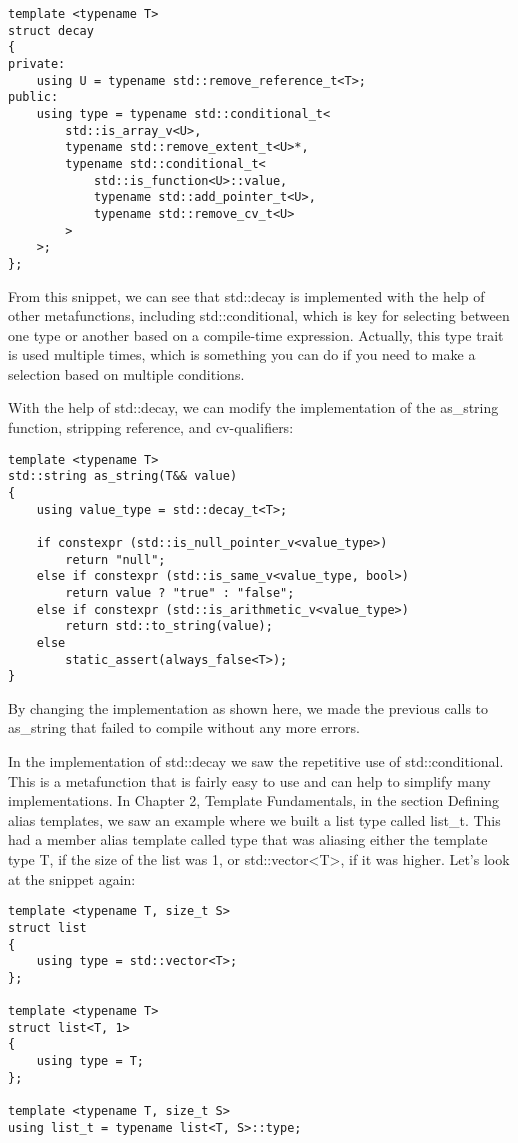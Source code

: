 \begin{lstlisting}[style=styleCXX]
template <typename T>
struct decay
{
private:
	using U = typename std::remove_reference_t<T>;
public:
	using type = typename std::conditional_t<
		std::is_array_v<U>,
		typename std::remove_extent_t<U>*,
		typename std::conditional_t<
			std::is_function<U>::value,
			typename std::add_pointer_t<U>,
			typename std::remove_cv_t<U>
		>
	>;
};
\end{lstlisting}

From this snippet, we can see that std::decay is implemented with the help of other metafunctions, including std::conditional, which is key for selecting between one type or another based on a compile-time expression. Actually, this type trait is used multiple times, which is something you can do if you need to make a selection based on multiple conditions.

With the help of std::decay, we can modify the implementation of the as\_string function, stripping reference, and cv-qualifiers:

\begin{lstlisting}[style=styleCXX]
template <typename T>
std::string as_string(T&& value)
{
	using value_type = std::decay_t<T>;
	
	if constexpr (std::is_null_pointer_v<value_type>)
		return "null";
	else if constexpr (std::is_same_v<value_type, bool>)
		return value ? "true" : "false";
	else if constexpr (std::is_arithmetic_v<value_type>)
		return std::to_string(value);
	else
		static_assert(always_false<T>);
}
\end{lstlisting}

By changing the implementation as shown here, we made the previous calls to as\_string that failed to compile without any more errors.

In the implementation of std::decay we saw the repetitive use of std::conditional. This is a metafunction that is fairly easy to use and can help to simplify many implementations. In Chapter 2, Template Fundamentals, in the section Defining alias templates, we saw an example where we built a list type called list\_t. This had a member alias template called type that was aliasing either the template type T, if the size of the list was 1, or std::vector<T>, if it was higher. Let’s look at the snippet again:

\begin{lstlisting}[style=styleCXX]
template <typename T, size_t S>
struct list
{
	using type = std::vector<T>;
};

template <typename T>
struct list<T, 1>
{
	using type = T;
};

template <typename T, size_t S>
using list_t = typename list<T, S>::type;
\end{lstlisting}

